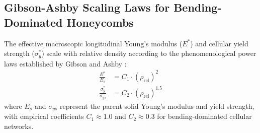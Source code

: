 \documentclass[preprint,12pt,3p]{elsarticle}
\begin{document}
\subsection{Gibson-Ashby Scaling Laws for Bending-Dominated Honeycombs}
The effective macroscopic longitudinal Young's modulus ($E^*$) and cellular yield strength ($\sigma_y^*$) scale with relative density according to the phenomenological power laws established by Gibson and Ashby \cite{gibson1997,zhong2023}:
\begin{align}
  \frac{E^*}{E_s} &= C_1 \cdot \left(\rho_{\text{rel}}\right)^2 \label{eq:ga-modulus} \\
  \frac{\sigma_y^*}{\sigma_{ys}} &= C_2 \cdot \left(\rho_{\text{rel}}\right)^{1.5} \label{eq:ga-yield}
\end{align}
where $E_s$ and $\sigma_{ys}$ represent the parent solid Young's modulus and yield strength, with empirical coefficients $C_1 \approx 1.0$ and $C_2 \approx 0.3$ for bending-dominated cellular networks.
\end{document}
